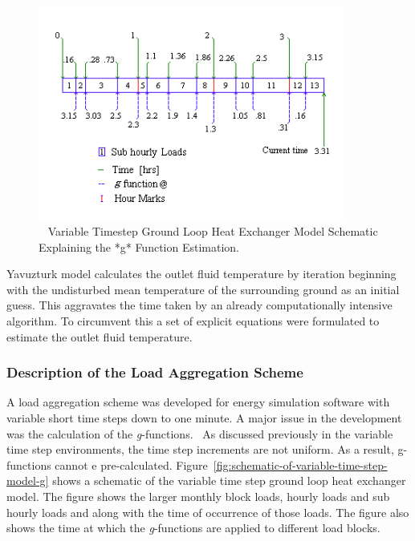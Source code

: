 \begin{figure}[hbtp] %
\centering
\includegraphics[width=0.9\textwidth, height=0.9\textheight, keepaspectratio=true]{media/image5655.png}
\caption{  Variable Timestep Ground Loop Heat Exchanger Model Schematic Explaining the *g* Function Estimation. \protect \label{fig:variable-timestep-ground-loop-heat-exchanger}}
\end{figure}

Yavuzturk model calculates the outlet fluid temperature by iteration beginning with the undisturbed mean temperature of the surrounding ground as an initial guess. This aggravates the time taken by an already computationally intensive algorithm. To circumvent this a set of explicit equations were formulated to estimate the outlet fluid temperature.

\subsubsection{Description of the Load Aggregation Scheme}\label{description-of-the-load-aggregation-scheme}

A load aggregation scheme was developed for energy simulation software with variable short time steps down to one minute. A major issue in the development was the calculation of the \emph{g}-functions.~ As discussed previously in the variable time step environments, the time step increments are not uniform. As a result, g-functions cannot e pre-calculated. Figure~\ref{fig:schematic-of-variable-time-step-model-g} shows a schematic of the variable time step ground loop heat exchanger model. The figure shows the larger monthly block loads, hourly loads and sub hourly loads and along with the time of occurrence of those loads. The figure also shows the time at which the \emph{g}-functions are applied to different load blocks.

